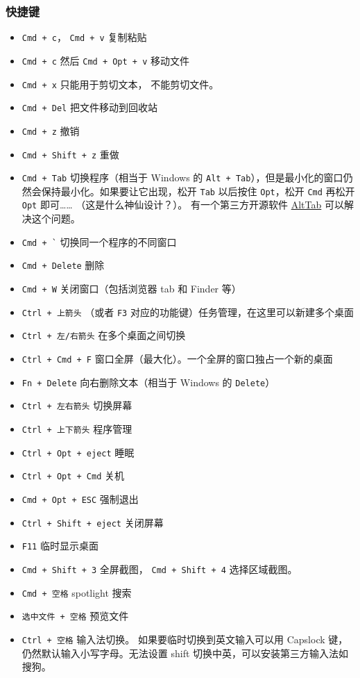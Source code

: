 \subsubsection{快捷键}
\begin{itemize}
\item \verb|Cmd + c|， \verb|Cmd + v| 复制粘贴
\item \verb|Cmd + c| 然后 \verb|Cmd + Opt + v| 移动文件
\item \verb|Cmd + x| 只能用于剪切文本， 不能剪切文件。
\item \verb|Cmd + Del| 把文件移动到回收站
\item \verb|Cmd + z| 撤销
\item \verb|Cmd + Shift + z| 重做
\item \verb|Cmd + Tab| 切换程序（相当于 Windows 的 \verb`Alt + Tab`），但是最小化的窗口仍然会保持最小化。如果要让它出现，松开 \verb`Tab` 以后按住 \verb`Opt`，松开 \verb`Cmd` 再松开 \verb`Opt` 即可…… （这是什么神仙设计？）。 有一个第三方开源软件 \href{https://alt-tab-macos.netlify.app/}{AltTab} 可以解决这个问题。
\item \verb|Cmd + `| 切换同一个程序的不同窗口
\item \verb|Cmd + Delete| 删除
\item \verb`Cmd + W` 关闭窗口（包括浏览器 tab 和 Finder 等）
\item \verb`Ctrl + 上箭头` （或者 \verb`F3` 对应的功能键）任务管理，在这里可以新建多个桌面
\item \verb`Ctrl + 左/右箭头` 在多个桌面之间切换
\item \verb`Ctrl + Cmd + F` 窗口全屏（最大化）。一个全屏的窗口独占一个新的桌面
\item \verb|Fn + Delete| 向右删除文本（相当于 Windows 的 \verb|Delete|）
\item \verb|Ctrl + 左右箭头| 切换屏幕
\item \verb|Ctrl + 上下箭头| 程序管理
\item \verb|Ctrl + Opt + eject| 睡眠
\item \verb|Ctrl + Opt + Cmd| 关机
\item \verb|Cmd + Opt + ESC| 强制退出
\item \verb|Ctrl + Shift + eject| 关闭屏幕
\item \verb|F11| 临时显示桌面
\item \verb|Cmd + Shift + 3| 全屏截图， \verb|Cmd + Shift + 4| 选择区域截图。
\item \verb|Cmd + 空格| spotlight 搜索
\item \verb|选中文件 + 空格| 预览文件
\item \verb|Ctrl + 空格| 输入法切换。 如果要临时切换到英文输入可以用 Capslock 键，仍然默认输入小写字母。无法设置 shift 切换中英，可以安装第三方输入法如搜狗。
\end{itemize}

